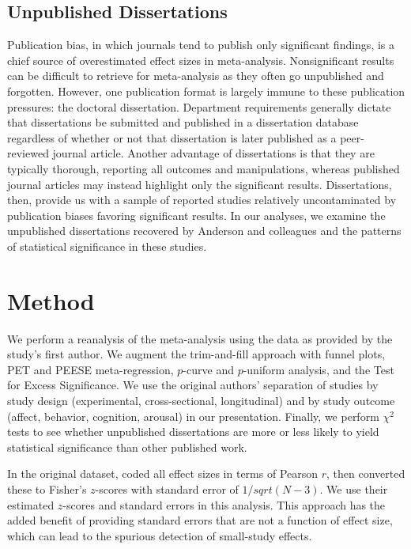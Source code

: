 \documentclass[man, mask]{apa6}
\begin{document}
\subsection{Unpublished Dissertations}
Publication bias, in which journals tend to publish only significant findings, is a chief source of overestimated effect sizes in meta-analysis. Nonsignificant results can be difficult to retrieve for meta-analysis as they often go unpublished and forgotten. However, one publication format is largely immune to these publication pressures: the doctoral dissertation. Department requirements generally dictate that dissertations be submitted and published in a dissertation database regardless of whether or not that dissertation is later published as a peer-reviewed journal article.  Another advantage of dissertations is that they are typically thorough, reporting all outcomes and manipulations, whereas published journal articles may instead highlight only the significant results.  Dissertations, then, provide us with a sample of reported studies relatively uncontaminated by publication biases favoring significant results. In our analyses, we examine the unpublished  dissertations recovered by Anderson and colleagues and the patterns of statistical significance in these studies.

\section{Method}
We perform a reanalysis of the \citet{Anderson:etal:2010} meta-analysis using the data as provided by the study's first author.  We augment the trim-and-fill approach with funnel plots, PET and PEESE meta-regression, $p$-curve and $p$-uniform analysis, and the Test for Excess Significance. We use the original authors' separation of studies by study design (experimental, cross-sectional, longitudinal) and by study outcome (affect, behavior, cognition, arousal) in our presentation. Finally, we perform $\chi^2$ tests to see whether unpublished dissertations are more or less likely to yield statistical significance than other published work.

In the original dataset, \citet{Anderson:etal:2010} coded all effect sizes in terms of Pearson $r$, then converted these to Fisher's $z$-scores with standard error of $1/sqrt(N-3)$. We use their estimated $z$-scores and standard errors in this analysis. This approach has the added benefit of providing standard errors that are not a function of effect size, which can lead to the spurious detection of small-study effects.
\end{document}

